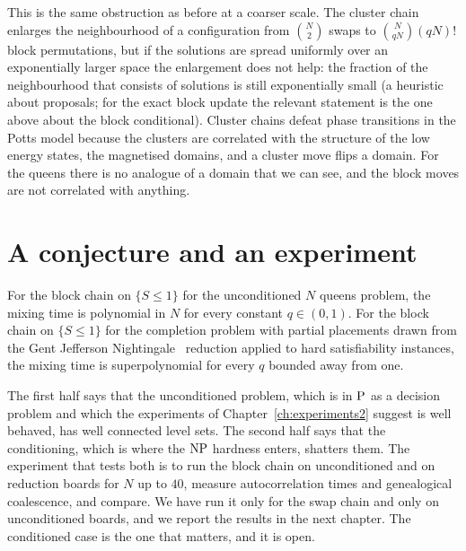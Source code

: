 This is the same obstruction as before at a coarser scale. The cluster chain enlarges the neighbourhood of a configuration from $\binom{N}{2}$ swaps to $\binom{N}{qN} (qN)!$ block permutations, but if the solutions are spread uniformly over an exponentially larger space the enlargement does not help: the fraction of the neighbourhood that consists of solutions is still exponentially small (a heuristic about proposals; for the exact block update the relevant statement is the one above about the block conditional). Cluster chains defeat phase transitions in the Potts model because the clusters are correlated with the structure of the low energy states, the magnetised domains, and a cluster move flips a domain. For the queens there is no analogue of a domain that we can see, and the block moves are not correlated with anything.

\section{A conjecture and an experiment}

\begin{conjecture}
\label{conj:blockmix}
For the block chain on $\{ S \le 1 \}$ for the unconditioned $N$ queens problem, the mixing time is polynomial in $N$ for every constant $q \in (0, 1)$. For the block chain on $\{ S \le 1 \}$ for the completion problem with partial placements drawn from the Gent Jefferson Nightingale~\cite{GJN} reduction applied to hard satisfiability instances, the mixing time is superpolynomial for every $q$ bounded away from one.
\end{conjecture}

The first half says that the unconditioned problem, which is in $\mathrm{P}$ as a decision problem and which the experiments of Chapter~\ref{ch:experiments2} suggest is well behaved, has well connected level sets. The second half says that the conditioning, which is where the $\mathrm{NP}$ hardness enters, shatters them. The experiment that tests both is to run the block chain on unconditioned and on reduction boards for $N$ up to $40$, measure autocorrelation times and genealogical coalescence, and compare. We have run it only for the swap chain and only on unconditioned boards, and we report the results in the next chapter. The conditioned case is the one that matters, and it is open.
